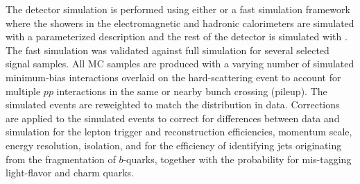 The detector simulation is performed using either  or a fast simulation framework where the showers in the electromagnetic and hadronic calorimeters are simulated with a parameterized description and the rest of the detector is simulated with . The fast simulation was validated against full  simulation for several selected signal samples. All MC samples are produced with a varying number of simulated minimum-bias interactions overlaid on the hard-scattering event to account for multiple $pp$ interactions in the same or nearby bunch crossing (pileup). The simulated events are reweighted to match the distribution in data. Corrections are applied to the simulated events to correct for differences between data and simulation for the lepton trigger and reconstruction efficiencies, momentum scale, energy resolution, isolation, and for the efficiency of identifying jets originating from the fragmentation of $b$-quarks, together with the probability for mis-tagging light-flavor and charm quarks.